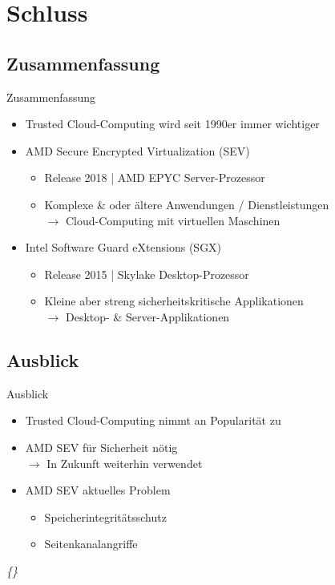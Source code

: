 \documentclass{sdqbeamer}
\begin{document}
\section{Schluss}
\subsection{Zusammenfassung}
\begin{frame}{Zusammenfassung}
	\begin{itemize}
		\item Trusted Cloud-Computing wird seit 1990er immer wichtiger
		\item AMD Secure Encrypted Virtualization (SEV)
		\begin{itemize}
			\item Release 2018 | AMD EPYC Server-Prozessor
			\item Komplexe \& oder ältere Anwendungen / Dienstleistungen\\
				\(\rightarrow\) Cloud-Computing mit virtuellen Maschinen
		\end{itemize}
		\item Intel Software Guard eXtensions (SGX)
		\begin{itemize}
			\item Release 2015 | Skylake Desktop-Prozessor
			\item Kleine aber streng sicherheitskritische Applikationen\\
				\(\rightarrow\) Desktop- \& Server-Applikationen
		\end{itemize}
	\end{itemize}
\end{frame}

\subsection{Ausblick}
\begin{frame}{Ausblick}
	\begin{itemize}
		\item Trusted Cloud-Computing nimmt an Popularität zu
		\item AMD SEV für Sicherheit nötig \\
			\(\rightarrow\) In Zukunft weiterhin verwendet
		\item AMD SEV aktuelles Problem
		\begin{itemize}
			\item Speicherintegritätsschutz
			\item Seitenkanalangriffe
		\end{itemize}
	\end{itemize}
	\vfill
	\small\textit{\{\cite{computerbase}\}}
\end{frame}
\end{document}
